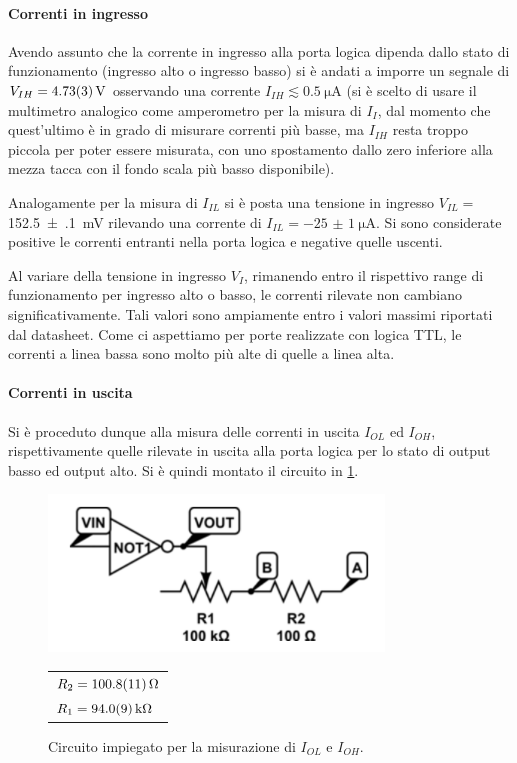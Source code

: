 \documentclass[a4paper,11pt]{article}
\begin{document}
\paragraph{Correnti in ingresso} 
Avendo assunto che la corrente in ingresso alla porta logica dipenda dallo stato di funzionamento (ingresso alto o ingresso basso) si è andati a imporre un segnale di $V_{IH} = \SI{4.73\pm 0.03}{\volt}$ osservando una corrente $I_{IH} \lesssim \SI{0.5}{\micro \ampere}$ (si è scelto di usare il multimetro analogico come amperometro per la misura di $I_I$, dal momento che quest'ultimo è in grado di misurare correnti più basse, ma $I_{IH}$ resta troppo piccola per poter essere misurata, con uno spostamento dallo zero inferiore alla mezza tacca con il fondo scala più basso disponibile).

Analogamente per la misura di  $I_{IL}$ si è posta una tensione in ingresso $V_{IL} =$ \SI{152.5(1)}{\milli\volt} rilevando una corrente di $I_{IL}=\SI{-25(1)}{\micro \ampere}$. Si sono considerate positive le correnti entranti nella porta logica e negative quelle uscenti.

Al variare della tensione in ingresso $V_{I}$, rimanendo entro il rispettivo range di funzionamento per ingresso alto o basso, le correnti rilevate non cambiano significativamente. Tali valori sono ampiamente entro i valori massimi riportati dal datasheet.
Come ci aspettiamo per porte realizzate con	logica TTL, le correnti a linea bassa sono molto più alte di quelle a linea	alta.

\paragraph{Correnti in uscita} Si è proceduto dunque alla misura delle correnti in uscita $I_{OL}$ ed $I_{OH}$, rispettivamente quelle rilevate in uscita alla porta logica per lo stato di output basso ed output alto.
Si è quindi montato il circuito in \figurename{ \ref{f:c2}}.

\begin{figure}[H]
	\begin{minipage}{0.7\textwidth}
		\centering
		\includegraphics[scale=0.75]{cir2.png}
		\caption{Circuito impiegato per la misurazione di $I_{OL}$ e $I_{OH}$. }
		\label{f:c2}
	\end{minipage}
	\begin{minipage}{0.3\textwidth}
		\begin{tabular}{l}
		$R_{2} = \SI{100.8 \pm 1.1}{\ohm}$\\
		$R_{1} = \SI{94.0 \pm 0.9 }{ \kilo \ohm}$
		\end{tabular}
	\end{minipage}
\end{figure}
\end{document}
